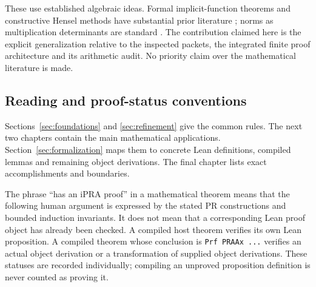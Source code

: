 These use established algebraic ideas. Formal implicit-function theorems
and constructive Hensel methods have substantial prior literature
\cite{Hu,AlonsoLombardiNeuwirth}; norms as multiplication determinants are
standard \cite{StacksNorm}. The contribution claimed here is the explicit
generalization relative to the inspected packets, the integrated finite
proof architecture and its arithmetic audit. No priority claim over the
mathematical literature is made.

\subsection{Reading and proof-status conventions}

Sections~\ref{sec:foundations} and \ref{sec:refinement} give the common
rules. The next two chapters contain the main mathematical applications.
Section~\ref{sec:formalization} maps them to concrete Lean definitions,
compiled lemmas and remaining object derivations. The final chapter lists
exact accomplishments and boundaries.

The phrase ``has an iPRA proof'' in a mathematical theorem means that the
following human argument is expressed by the stated PR constructions and
bounded induction invariants. It does not mean that a corresponding Lean
proof object has already been checked. A compiled host theorem verifies
its own Lean proposition. A compiled theorem whose conclusion is
\texttt{Prf PRAAx ...} verifies an actual object derivation or a transformation
of supplied object derivations. These statuses are recorded individually;
compiling an unproved proposition definition is never counted as proving it.

